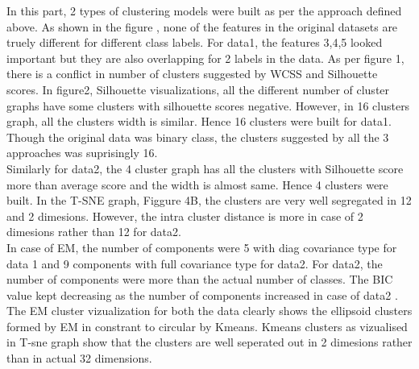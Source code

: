 \documentclass[12pt]{article}
\begin{document}
In this part, 2 types of clustering models were built as per the approach defined above. As shown in the figure , none of the features in the original datasets are truely different for different class labels. For data1, the features 3,4,5 looked important but they are also overlapping for 2 labels in the data. 
As per figure 1, there is a conflict in number of clusters suggested by WCSS and Silhouette scores. In figure2, Silhouette visualizations, all the different number of cluster graphs have some clusters with silhouette scores negative. However, in 16 clusters graph, all the clusters width is similar. Hence 16 clusters were built for data1. Though the original data was binary class, the clusters suggested by all the 3 approaches was suprisingly 16.\\

Similarly for data2, the 4 cluster graph has all the clusters with Silhouette score more than average score and the width is almost same. Hence 4 clusters were built. In the T-SNE graph, Figgure 4B, the clusters are very well segregated in 12 and 2 dimesions. However, the intra cluster distance is more in case of 2 dimesions rather than 12 for data2.\\
In case of EM, the number of components were 5 with diag covariance type for data 1 and 	9 components with full covariance type for data2. For data2, the number of components were more than the actual number of classes. The BIC value kept decreasing as the number of components increased in case of data2 . The EM cluster vizualization for both the data clearly shows the ellipsoid clusters formed by EM in constrant to circular by Kmeans. Kmeans clusters as vizualised in T-sne graph show that the clusters are well seperated out in 2 dimesions rather than in actual 32 dimensions.
\end{document}
